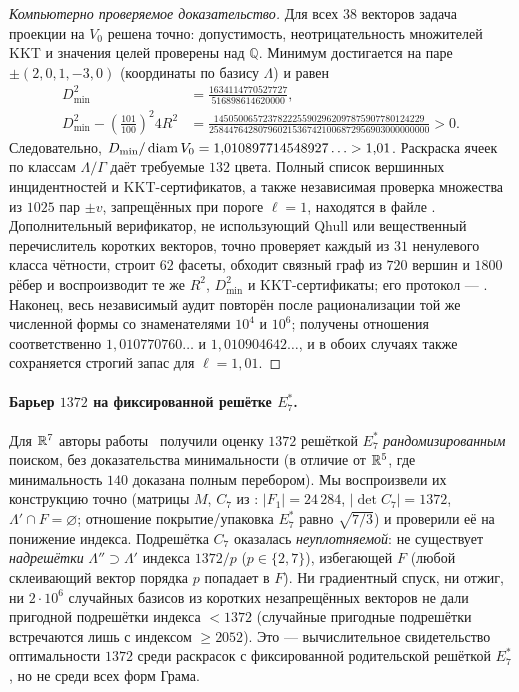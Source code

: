 \begin{proof}[Компьютерно проверяемое доказательство]
Для всех $38$ векторов задача проекции на $V_0$ решена точно: допустимость,
неотрицательность множителей KKT и значения целей проверены над $\mathbb Q$.
Минимум достигается на паре
$\pm(2,0,1,-3,0)$ (координаты по базису $\Lambda$) и равен
\[
\begin{aligned}
D_{\min}^2&=
\frac{1634114770527727}{516898614620000},\\
D_{\min}^2-\left(\frac{101}{100}\right)^2 4R^2
&=\frac{1450500657237822255902962097875907780124229}
{258447642807960215367421006872956903000000000}>0.
\end{aligned}
\]
Следовательно,
$D_{\min}/\operatorname{diam} V_0=1{,}010897714548927\ldots>1{,}01$.
Раскраска ячеек по классам $\Lambda/\Gamma$ даёт требуемые $132$ цвета.
Полный список вершинных инцидентностей и KKT-сертификатов, а также независимая
проверка множества из $1025$ пар $\pm v$, запрещённых при пороге $\ell=1$,
находятся в файле
.
Дополнительный верификатор, не использующий Qhull или вещественный
перечислитель коротких векторов, точно проверяет каждый из $31$ ненулевого
класса чётности, строит $62$ фасеты, обходит связный граф из $720$ вершин и
$1800$ рёбер и воспроизводит те же $R^2$, $D_{\min}^2$ и KKT-сертификаты;
его протокол ---
.
Наконец, весь независимый аудит повторён после рационализации той же численной
формы со знаменателями $10^4$ и $10^6$; получены отношения соответственно
$1{,}010770760\ldots$ и $1{,}010904642\ldots$, и в обоих случаях также
сохраняется строгий запас для $\ell=1{,}01$.
\end{proof}

\paragraph{Барьер $1372$ на фиксированной решётке $E_7^*$.} Для $\mathbb{R}^7$
авторы работы~\cite{ABPR} получили оценку $1372$ решёткой $E_7^*$ \emph{рандомизированным}
поиском, без доказательства минимальности (в отличие от $\mathbb{R}^5$, где минимальность
$140$ доказана полным перебором). Мы воспроизвели их конструкцию точно (матрицы
$M$, $C_7$ из \cite{ABPR}: $|F_1|=24\,284$, $|\det C_7|=1372$, $\Lambda'\cap
F=\varnothing$; отношение покрытие/упаковка $E_7^*$ равно $\sqrt{7/3}$) и
проверили её на понижение индекса. Подрешётка $C_7$ оказалась
\emph{неуплотняемой}: не существует \emph{надрешётки} $\Lambda''\supset\Lambda'$
индекса $1372/p$ ($p\in\{2,7\}$), избегающей $F$ (любой склеивающий вектор
порядка $p$ попадает в $F$). Ни градиентный спуск, ни отжиг, ни $2\cdot10^6$
случайных базисов из коротких незапрещённых векторов не дали пригодной подрешётки
индекса ${<}1372$ (случайные пригодные подрешётки встречаются лишь с индексом
${\ge}2052$). Это --- вычислительное свидетельство оптимальности $1372$ среди
раскрасок с фиксированной родительской решёткой $E_7^*$, но не среди всех форм
Грама.


